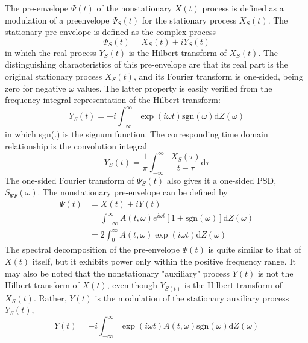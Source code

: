 \documentclass{article}
\begin{document}
The pre-envelope $\Psi (t)$ of the nonstationary $X (t)$ process is defined as
a modulation of a preenvelope $\Psi_S (t)$ for the stationary process $X_S
(t)$. The stationary pre-envelope is defined as the complex process
\begin{equation}
  \Psi_S (t) = X_S (t) + iY_S (t) \label{eq:23}
\end{equation}
in which the real process $Y_S (t)$ is the Hilbert transform of $X_S (t)$. The
distinguishing characteristics of this pre-envelope are that its real part is
the original stationary process $X_S (t)$, and its Fourier transform is
one-sided, being zero for negative $\omega$ values. The latter property is
easily verified from the frequency integral representation of the Hilbert
transform:
\begin{equation}
  Y_S (t) = - i \int_{- \infty}^{\infty} \exp (i \omega t) \mathrm{sgn}
  (\omega) \mathrm{d} Z (\omega) \label{eq:24}
\end{equation}
in which sgn(.) is the signum function. The corresponding time domain
relationship is the convolution integral
\begin{equation}
  Y_S (t) = \frac{1}{\pi}  \int_{- \infty}^{\infty} \frac{X_S (\tau)}{t -
  \tau} \mathrm{d} \tau \label{eq:25}
\end{equation}
The one-sided Fourier transform of $\Psi_S (t)$ also gives it a one-sided PSD,
$S_{\Psi \Psi} (\omega)$. The nonstationary pre-envelope can be defined by
\begin{equation}
  \begin{array}{ll}
    \Psi (t) & = X (t) + iY (t)\\
    & = \int_{- \infty}^{\infty} A (t, \omega) e^{i \omega t}  [1 +
    \mathrm{sgn} (\omega)] \mathrm{d} Z (\omega)\\
    & = 2 \int_0^{\infty} A (t, \omega) \exp (i \omega t) \mathrm{d} Z
    (\omega)
  \end{array} \label{eq:26}
\end{equation}
The spectral decomposition of the pre-envelope $\Psi (t)$ is quite similar to
that of $X (t)$ itself, but it exhibits power only within the positive
frequency range. It may also be noted that the nonstationary "auxiliary"
process $Y (t)$ is not the Hilbert transform of $X (t)$, even though $Y_{S
(t)}$ is the Hilbert transform of $X_S (t)$. Rather, $Y (t)$ is the modulation
of the stationary auxiliary process $Y_S (t)$,
\begin{equation}
  Y (t) = - i \int_{- \infty}^{\infty} \exp (i \omega t) A (t, \omega)
  \mathrm{sgn} (\omega) \mathrm{d} Z (\omega) \label{eq:27}
\end{equation}
\end{document}
